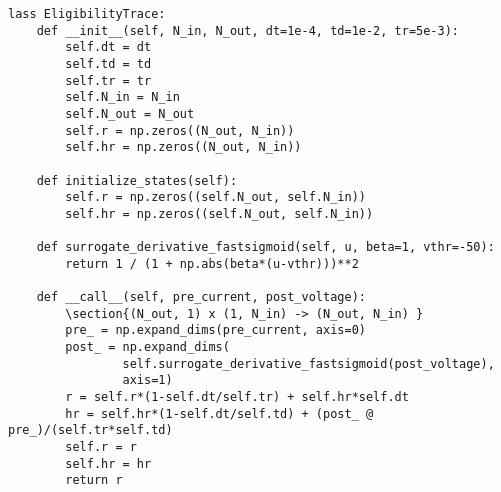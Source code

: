 \begin{verbatim}
lass EligibilityTrace:
    def __init__(self, N_in, N_out, dt=1e-4, td=1e-2, tr=5e-3):
        self.dt = dt
        self.td = td
        self.tr = tr
        self.N_in = N_in
        self.N_out = N_out
        self.r = np.zeros((N_out, N_in))
        self.hr = np.zeros((N_out, N_in))
    
    def initialize_states(self):
        self.r = np.zeros((self.N_out, self.N_in))
        self.hr = np.zeros((self.N_out, self.N_in))
    
    def surrogate_derivative_fastsigmoid(self, u, beta=1, vthr=-50):
        return 1 / (1 + np.abs(beta*(u-vthr)))**2

    def __call__(self, pre_current, post_voltage):
        \section{(N_out, 1) x (1, N_in) -> (N_out, N_in) }
        pre_ = np.expand_dims(pre_current, axis=0)
        post_ = np.expand_dims(
                self.surrogate_derivative_fastsigmoid(post_voltage), 
                axis=1)
        r = self.r*(1-self.dt/self.tr) + self.hr*self.dt 
        hr = self.hr*(1-self.dt/self.td) + (post_ @ pre_)/(self.tr*self.td)
        self.r = r
        self.hr = hr
        return r
\end{verbatim}
